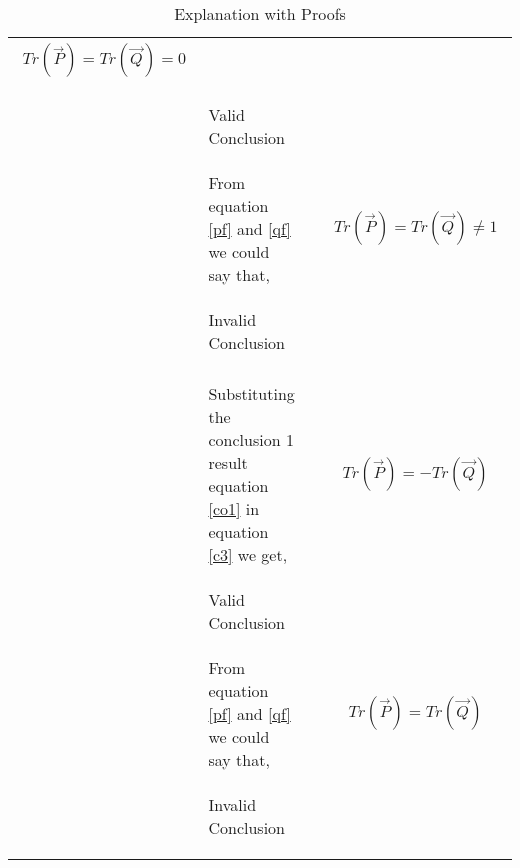\documentclass[journal,12pt]{IEEEtran}
\begin{document}
\begin{longtable}{|l|l|}
{\begin{align}
     Tr(\vec{P})=Tr(\vec{Q})=0 \label{co1}
     \end{align}}\\
& \parbox{10cm}{\begin{center}
Valid Conclusion
\end{center}}
\hline
{} & \\
\hline
{} & From equation \eqref{pf} and \eqref{qf} we could say that,
& &\parbox{10cm}{\begin{align}
     Tr(\vec{P})=Tr(\vec{Q})\neq 1 
     \end{align}}\\
& \parbox{10cm}{\begin{center}
Invalid Conclusion
\end{center}}
\hline
\pagebreak
\hline
{}&\\
 & \\
\hline
{} & Substituting the conclusion 1 result equation \eqref{co1} in equation \eqref{c3} we get,
& &\parbox{10cm}{\begin{align}
     Tr(\vec{P})=-Tr(\vec{Q}) 
     \end{align}}\\
& \parbox{10cm}{\begin{center}
Valid Conclusion
\end{center}}
\hline
{} & \\
\hline
{} & From equation \eqref{pf} and \eqref{qf} we could say that,
& &\parbox{10cm}{\begin{align}
     Tr(\vec{P})=Tr(\vec{Q}) 
     \end{align}}\\
& \parbox{10cm}{\begin{center}
Invalid Conclusion
\end{center}}
\hline
\caption{Explanation with Proofs}
\label{table:1}
\end{longtable}
\end{document}
